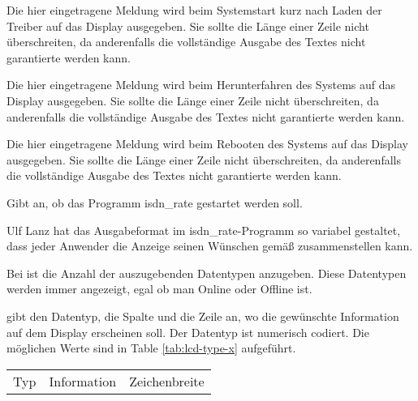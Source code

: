 \begin{description}

       Die hier eingetragene Meldung wird beim Systemstart kurz nach Laden der
       Treiber auf das Display ausgegeben. Sie sollte die Länge einer Zeile 
       nicht überschreiten, da anderenfalls die vollständige Ausgabe des Textes 
       nicht garantierte werden kann.


       Die hier eingetragene Meldung wird beim Herunterfahren des Systems
       auf das Display ausgegeben. Sie sollte die Länge einer Zeile 
       nicht überschreiten, da anderenfalls die vollständige Ausgabe des Textes 
       nicht garantierte werden kann.


       Die hier eingetragene Meldung wird beim Rebooten des Systems
       auf das Display ausgegeben. Sie sollte die Länge einer Zeile 
       nicht überschreiten, da anderenfalls die vollständige Ausgabe des Textes 
       nicht garantierte werden kann.


      Gibt an, ob das Programm isdn\_rate gestartet werden soll.


      Ulf Lanz hat das Ausgabeformat im isdn\_rate-Programm so variabel
      gestaltet, dass jeder Anwender die Anzeige seinen Wünschen gemäß
      zusammenstellen kann.

      Bei  ist die Anzahl der auszugebenden Datentypen anzugeben.
      Diese Datentypen werden immer angezeigt, egal ob man Online oder
      Offline ist.



         gibt den Datentyp, die Spalte und die Zeile an, wo die
        gewünschte Information auf dem Display erscheinen soll. Der
        Datentyp ist numerisch codiert. Die möglichen Werte sind in
        Table \ref{tab:lcd-type-x} aufgeführt.

        \begin{table}[htbp]
          \begin{small}
          \begin{center}
            \begin{tabular}{rlr}
               Typ &     Information   &             Zeichenbreite\\



\end{tabular}
\end{center}
\end{small}
\end{table}
\end{description}
